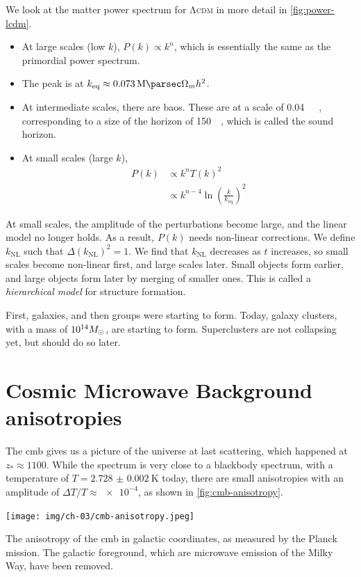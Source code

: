 We look at the matter power spectrum for \textsc{Λcdm} in more detail in \cref{fig:power-lcdm}. 
\begin{itemize}
	\item At large scales (low $k$), $P(k) \propto k^n$, which is essentially the same as the primordial power spectrum.
	\item The peak is at $k_\text{eq} \approx \SI{0.073}{\per\mega\parsec} \Omega_m h^2$.
	\item At intermediate scales, there are \acp{bao}. These are at a scale of \SI{0.04}{\per\mega\parsec}, corresponding to a size of the horizon of \SI{150}{\mega\parsec}, which is called the sound horizon.
	\item At small scales (large $k$),
	\begin{align*}
		P(k)
		&\propto k^n T(k)^2\\
		&\propto k^{n-4} \ln
		\left( \frac{k}{k_\text{eq}} \right)^2
	\end{align*}
\end{itemize}
At small scales, the amplitude of the perturbations become large, and the linear model no longer holds. As a result, $P(k)$ needs non-linear corrections. We define $k_\text{NL}$ such that $\Delta(k_\text{NL})^2 = 1$. We find that $k_\text{NL}$ decreases as $t$ increases, so small scales become non-linear first, and large scales later. Small objects form earlier, and large objects form later by merging of smaller ones. This is called a \emph{hierarchical model} for structure formation.
 
First, galaxies, and then groups were starting to form.
Today, galaxy clusters, with a mass of $\num{e14} M_\odot$, are starting to form.
Superclusters are not collapsing yet, but should do so later.






\section{Cosmic Microwave Background anisotropies}
The \ac{cmb} gives us a picture of the universe at last scattering, which happened at $z_* \approx \num{1100}$. While the spectrum is very close to a blackbody spectrum, with a temperature of $T = \SI{2.728(2)}{\kelvin}$ today, there are small anisotropies with an amplitude of $\Delta T / T \approx \num{e-4}$, as shown in \cref{fig:cmb-anisotropy}.

\begin{marginfigure}
	\centering
	\texttt{[image: img/ch-03/cmb-anisotropy.jpeg]}
	\caption{The anisotropy of the \ac{cmb} in galactic coordinates, as measured by the Planck mission. The galactic foreground, which are microwave emission of the Milky Way, have been removed.}
	\label{fig:cmb-anisotropy}
\end{marginfigure}

